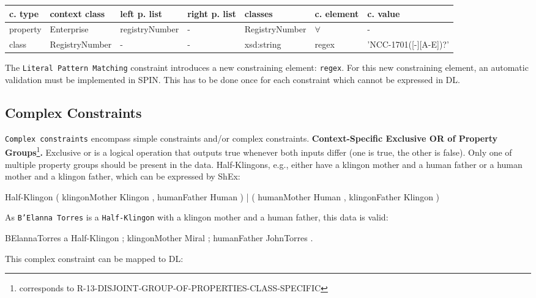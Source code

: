 \documentclass{llncs}
\newcommand{\ms}[1]{\texttt{#1}}
\newenvironment{gcotable}{
  \scriptsize
  \sffamily
  \vspace{0.3cm}
	\begin{center}
  \begin{tabular}{l|l|l|l|l|l|l}
  \hline
  \textbf{c. type} & \textbf{context class} & \textbf{left p. list} & \textbf{right p. list} & \textbf{classes} & \textbf{c. element} & \textbf{c. value} \\
  \hline

}{
  \hline
  \end{tabular}
	\end{center}
}
\newenvironment{DL}{
  \vspace{0.3cm}
	\begin{center}
  \begin{tabular}{r l}

}{
  \end{tabular}
	\end{center}
}
\begin{document}
\begin{gcotable}
property & Enterprise & registryNumber & - & RegistryNumber & $\forall$ & - \\
class & RegistryNumber & - & - & xsd:string & regex & 'NCC-1701([-][A-E])?' \\
\end{gcotable}

The \ms{Literal Pattern Matching} constraint introduces a new constraining element: \ms{regex}.
For this new constraining element, an automatic validation must be implemented in SPIN.
This has to be done once for each constraint which cannot be expressed in DL.

\subsection{Complex Constraints}

\ms{Complex constraints} encompass simple constraints and/or complex constraints.
\textbf{Context-Specific Exclusive OR of Property Groups}\footnote{corresponds to R-13-DISJOINT-GROUP-OF-PROPERTIES-CLASS-SPECIFIC}\textbf{.}
Exclusive or is a logical operation that outputs true whenever both inputs differ (one is true, the other is false).
Only one of multiple property groups should be present in the data.
Half-Klingons, e.g., either have a klingon mother and a human father or a human mother and a klingon father, which can be expressed by ShEx:

\begin{ex}
Half-Klingon { 
    ( klingonMother Klingon , humanFather Human ) |
    ( humanMother Human , klingonFather Klingon ) }
\end{ex}

As \ms{B'Elanna Torres} is a \ms{Half-Klingon} with a klingon mother and a human father, this data is valid:

\begin{ex}
BElannaTorres a Half-Klingon ;
    klingonMother Miral ; humanFather JohnTorres .
\end{ex}


This complex constraint can be mapped to DL:
\end{document}
